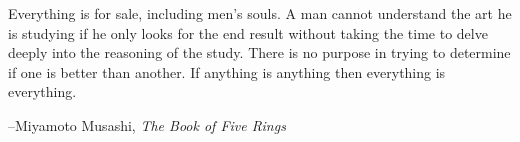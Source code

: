 \documentclass[fleqn,addpoints]{exam}
\begin{document}
\else

\vspace{4 in}

\begin{em}
Everything is for sale, including men's souls. A man cannot understand the art he is studying if he only looks for the end
result without taking the time to delve deeply into the reasoning of the study.  There is no purpose in trying to
determine if one is better than another.  If anything is anything then everything is everything.
\end{em}

\vspace{.2 cm}
\hspace{1.5 cm} --Miyamoto Musashi, {\em The Book of Five Rings}

\fi
\end{document}
